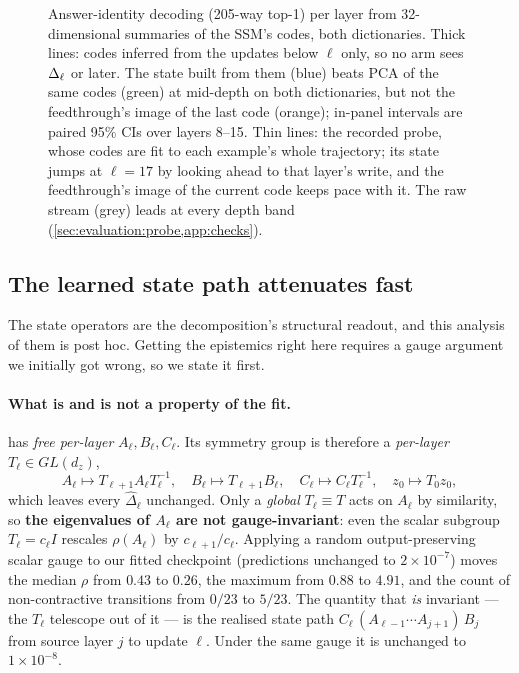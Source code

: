 \begin{figure}[t]
  \centering
  
  \caption{Answer-identity decoding (205-way top-1) per layer from
  32-dimensional summaries of the SSM's codes, both dictionaries. Thick lines:
  codes inferred from the updates below $\ell$ only, so no arm sees $\Delta_\ell$ or
  later. The state built from them (blue) beats PCA of the same codes (green)
  at mid-depth on both dictionaries, but not the feedthrough's image of the
  last code (orange); in-panel intervals are paired 95\% CIs over layers
  8--15. Thin lines: the recorded probe, whose codes are fit to each example's
  whole trajectory; its state jumps at $\ell{=}17$ by looking ahead to that
  layer's write, and the feedthrough's image of the current code keeps pace
  with it. The raw stream (grey) leads at every depth band
  (\cref{sec:evaluation:probe,app:checks}).}
  \label{fig:probe}
\end{figure}

\subsection{The learned state path attenuates fast}
\label{sec:evaluation:operator}

The state operators are the decomposition's structural readout, and this
analysis of them is post hoc. Getting the
epistemics right here requires a gauge argument we initially got wrong, so we
state it first.

\paragraph{What is and is not a property of the fit.}
 has \emph{free per-layer} $A_\ell, B_\ell, C_\ell$. Its
symmetry group is therefore a \emph{per-layer} $T_\ell \in GL(d_z)$,
\[
  A_\ell \mapsto T_{\ell+1} A_\ell T_\ell^{-1}, \quad
  B_\ell \mapsto T_{\ell+1} B_\ell, \quad
  C_\ell \mapsto C_\ell T_\ell^{-1}, \quad
  z_0 \mapsto T_0 z_0,
\]
which leaves every $\hat\Delta_\ell$ unchanged. Only a \emph{global}
$T_\ell \equiv T$ acts on $A_\ell$ by similarity, so \textbf{the eigenvalues of
$A_\ell$ are not gauge-invariant}: even the scalar subgroup $T_\ell = c_\ell I$
rescales $\rho(A_\ell)$ by $c_{\ell+1}/c_\ell$. Applying a random
output-preserving scalar gauge to our fitted checkpoint (predictions unchanged
to $2\times10^{-7}$) moves the median $\rho$ from $0.43$ to $0.26$, the maximum
from $0.88$ to $4.91$, and the count of non-contractive transitions from
$0/23$ to $5/23$. The quantity that \emph{is} invariant --- the $T_\ell$
telescope out of it --- is the realised state path
$C_\ell\,(A_{\ell-1}\cdots A_{j+1})\,B_j$ from source layer $j$ to update
$\ell$. Under the same gauge it is unchanged to $1\times10^{-8}$.

